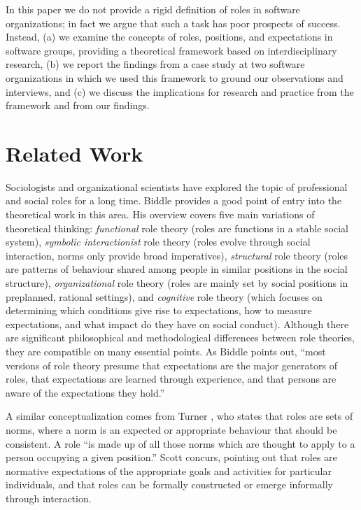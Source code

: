 \documentclass[10pt, conference, compsocconf]{IEEEtran}
\begin{document}
In this paper we do not provide a rigid definition of roles in software organizations; in fact we argue that such a task has poor prospects of success. Instead, (a) we examine the concepts of roles, positions, and expectations in software groups, providing a theoretical framework based on interdisciplinary research, (b) we report the findings from a case study at two software organizations in which we used this framework to ground our observations and interviews, and (c) we discuss the implications for research and practice from the framework and from our findings.




\section{Related Work}

Sociologists and organizational scientists have explored the topic of professional and social roles for a long time. Biddle \cite{Biddle1986} provides a good point of entry into the theoretical work in this area. His overview covers five main variations of theoretical thinking: \emph{functional} role theory (roles are functions in a stable social system), \emph{symbolic interactionist} role theory (roles evolve through social interaction, norms only provide broad imperatives), \emph{structural} role theory (roles are patterns of behaviour shared among people in similar positions in the social structure), \emph{organizational} role theory (roles are mainly set by social positions in preplanned, rational settings), and \emph{cognitive} role theory (which focuses on determining which conditions give rise to expectations, how to measure expectations, and what impact do they have on social conduct). Although there are significant philosophical and methodological differences between role theories, they are compatible on many essential points. As Biddle points out, ``most versions of role theory presume that expectations are the major generators of roles, that expectations are learned through experience, and that persons are aware of the expectations they hold.''

A similar conceptualization comes from Turner \cite{Turner1956}, who states that roles are sets of norms, where a norm is an expected or appropriate behaviour that should be consistent. A role ``is made up of all those norms which are thought to apply to a person occupying a given position.'' Scott \cite{Scott2008} concurs, pointing out that roles are normative expectations of the appropriate goals and activities for particular individuals, and that roles can be formally constructed or emerge informally through interaction.
\end{document}
